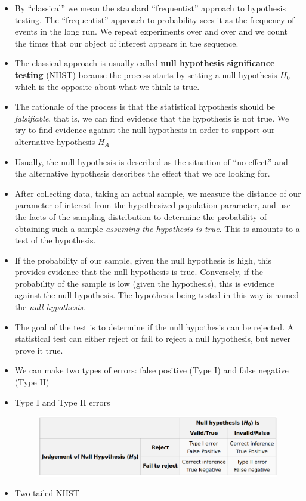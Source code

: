 \documentclass[]{book}
\begin{document}
\begin{itemize}
\item
  By ``classical'' we mean the standard ``frequentist'' approach to
  hypothesis testing. The ``frequentist'' approach to probability sees
  it as the frequency of events in the long run. We repeat experiments
  over and over and we count the times that our object of interest
  appears in the sequence.
\item
  The classical approach is usually called \textbf{null hypothesis
  significance testing} (NHST) because the process starts by setting a
  null hypothesis \(H_0\) which is the opposite about what we think is
  true.
\item
  The rationale of the process is that the statistical hypothesis should
  be \emph{falsifiable}, that is, we can find evidence that the
  hypothesis is not true. We try to find evidence against the null
  hypothesis in order to support our alternative hypothesis \(H_A\)
\item
  Usually, the null hypothesis is described as the situation of ``no
  effect'' and the alternative hypothesis describes the effect that we
  are looking for.
\item
  After collecting data, taking an actual sample, we measure the
  distance of our parameter of interest from the hypothesized population
  parameter, and use the facts of the sampling distribution to determine
  the probability of obtaining such a sample \emph{assuming the
  hypothesis is true}. This is amounts to a test of the hypothesis.
\item
  If the probability of our sample, given the null hypothesis is high,
  this provides evidence that the null hypothesis is true. Conversely,
  if the probability of the sample is low (given the hypothesis), this
  is evidence against the null hypothesis. The hypothesis being tested
  in this way is named the \emph{null hypothesis}.
\item
  The goal of the test is to determine if the null hypothesis can be
  rejected. A statistical test can either reject or fail to reject a
  null hypothesis, but never prove it true.
\item
  We can make two types of errors: false positive (Type I) and false
  negative (Type II)
\item
  Type I and Type II errors

  \begin{figure}[htbp]
  \centering
  \includegraphics{figures/typeIandIIwiki.png}
  \caption{}
  \end{figure}
\item
  Two-tailed NHST


\end{itemize}
\end{document}
